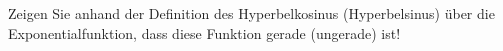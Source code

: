 \item Zeigen Sie anhand der Definition des Hyperbelkosinus (Hyperbelsinus) über die Exponentialfunktion, dass diese Funktion gerade (ungerade) ist!
